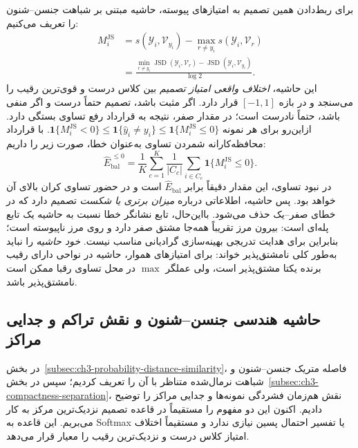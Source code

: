 برای ربط‌دادن همین تصمیم به امتیازهای پیوسته،
حاشیه مبتنی بر شباهت جنسن--شنون را تعریف می‌کنیم:
\begin{equation}\label{eq:ch3-js-margin-distance-difference}
\boxed{
\begin{aligned}
M_i^{\mathrm{JS}}
&=s(\mathscr Y_i,\mathcal V_{y_i})
-\max_{r\ne y_i}s(\mathscr Y_i,\mathcal V_r)\\
&=\frac{\displaystyle
\min_{r\ne y_i}\operatorname{JSD}(\mathscr Y_i,\mathcal V_r)
-\operatorname{JSD}(\mathscr Y_i,\mathcal V_{y_i})}
{\log 2}.
\end{aligned}}
\end{equation}
این حاشیه، \emph{اختلاف واقعی امتیاز تصمیم}
بین کلاس درست و قوی‌ترین رقیب را می‌سنجد و
در بازه $[-1,1]$ قرار دارد. اگر مثبت باشد، تصمیم
حتماً درست و اگر منفی باشد، حتماً نادرست است؛
در مقدار صفر، نتیجه به قرارداد رفع تساوی بستگی دارد.
ازاین‌رو برای هر نمونه
$\mathbf1\{M_i^{\mathrm{JS}}<0\}
\le\mathbf1\{\widehat y_i\ne y_i\}
\le\mathbf1\{M_i^{\mathrm{JS}}\le0\}$.
با قرارداد محافظه‌کارانه شمردن تساوی به‌عنوان خطا،
صورت زیر را داریم:
\begin{equation}\label{eq:ch3-js-hard-margin-error}
\widehat E_{\mathrm{bal}}^{\,\le0}
=\frac1K\sum_{c=1}^{K}\frac1{|C_c|}
\sum_{i\in C_c}
\mathbf1\{M_i^{\mathrm{JS}}\le0\}.
\end{equation}
در نبود تساوی، این مقدار دقیقاً برابر
$\widehat E_{\mathrm{bal}}$ است و در حضور تساوی
کران بالای آن خواهد بود.
پس حاشیه، اطلاعاتی درباره \emph{میزان برتری یا شکست}
تصمیم دارد که در خطای صفر--یک حذف می‌شود.
بااین‌حال، تابع نشانگر خطا نسبت به حاشیه یک تابع
پله‌ای است: بیرون مرز تقریباً همه‌جا مشتق صفر
دارد و روی مرز ناپیوسته است؛ بنابراین
برای هدایت تدریجی بهینه‌سازی گرادیانی مناسب نیست.
\emph{خود حاشیه} را نباید به‌طور کلی نامشتق‌پذیر
خواند: برای امتیازهای هموار، حاشیه در نواحی
دارای رقیب برنده یکتا مشتق‌پذیر است،
ولی عملگر $\max$ در محل تساوی رقبا ممکن است
نامشتق‌پذیر باشد.


\subsection{حاشیه هندسی جنسن--شنون و نقش تراکم و جدایی مراکز}
\label{subsec:ch3-js-metric-classification}
در بخش~\ref{subsec:ch3-probability-distance-similarity}، فاصله متریک جنسن--شنون و شباهت نرمال‌شده متناظر با آن را تعریف کردیم؛ سپس در بخش~\ref{subsec:ch3-compactness-separation}، نقش هم‌زمان فشردگی نمونه‌ها و جدایی مراکز را توضیح دادیم. اکنون این دو مفهوم را مستقیماً در قاعده تصمیم نزدیک‌ترین مرکز به کار می‌بریم. این قاعده به Softmax یا تفسیر احتمال پسین نیازی ندارد و مستقیماً اختلاف امتیاز کلاس درست و نزدیک‌ترین رقیب را معیار قرار می‌دهد.

